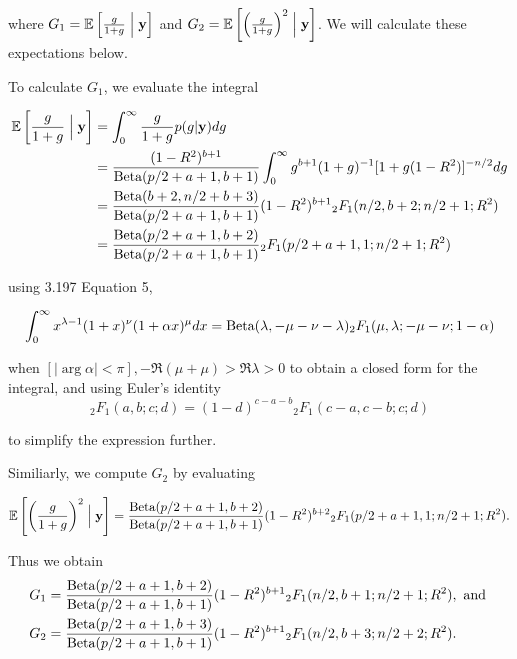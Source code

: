 \documentclass{amsart}[12pt]
\begin{document}
where $G_1 = \mathbb{E}\left[\frac{g}{1 + g} \Bigm| {\bf y} \right]$ and $G_2 = \mathbb{E}\left[ \left(\frac{g}{1 + g} \right)^2 \Bigm| {\bf y} \right]$. We will calculate these expectations below.

To calculate $G_1$, we evaluate the integral

\begin{align*}
	\mathbb{E}\left[\frac{g}{1 + g} \Bigm| {\bf y} \right] & = \int_0^\infty \frac{g}{1 + g} p(g | {\bf y}) dg                                                                      \\
	                                           & = \frac{(1 - R^2)^{b+1}}{\text{Beta}(p/2 + a + 1, b + 1)} \int_0^\infty g^{b+1} (1 + g)^{-1} [1 + g (1 - R^2)]^{-n/2} dg \\
	                                           & = \frac{\text{Beta}(b + 2, n/2 + b + 3)}{\text{Beta}(p /2 + a + 1, b + 1)} (1 - R^2)^{b+1} {}_2 F_1(n/2, b + 2; n/2 + 1; R^2)  \\
	                                           & = \frac{\text{Beta}(p/2 + a + 1, b + 2)}{\text{Beta}(p /2 + a + 1, b + 1)} {}_2 F_1(p/2 + a + 1, 1; n/2 + 1; R^2)              
\end{align*}

using \citep{Gradshteyn1988} 3.197 Equation 5,

\[
	\int_0^\infty x^{\lambda-1} (1+x)^\nu (1 + \alpha x)^{\mu} dx = \text{Beta}(\lambda, -\mu-\nu-\lambda) {}_2 F_1 (\mu, \lambda; -\mu-\nu; 1 - \alpha)
\]

when $[|\arg \alpha| < \pi], -\Re(\mu + \mu) > \Re \lambda > 0$ to obtain a closed form for the integral,  and
using Euler's identity
\[
	{}_2 F_1(a, b; c; d) = (1 - d)^{c - a -  b} {}_2 F_1(c - a, c - b; c; d)
\]

to simplify the expression further.

Similiarly, we compute $G_2$ by evaluating

\[
	\mathbb{E}\left[ \left(\frac{g}{1 + g} \right)^2 \Bigm| {\bf y} \right] = \frac{\text{Beta}(p/2 + a + 1, b + 2)}{\text{Beta}(p /2 + a + 1, b + 1)} (1 - R^2)^{b+2} {}_2 F_1(p/2 + a + 1, 1; n/2 + 1; R^2).
\]

Thus we obtain
\begin{align*}
	G_1 & = \frac{\text{Beta}(p/2 + a + 1, b + 2)}{\text{Beta}(p /2 + a + 1, b + 1)} (1 - R^2)^{b+1} {}_2 F_1(n/2, b + 1; n/2 + 1; R^2), \text{ and } \\
	G_2 & = \frac{\text{Beta}(p/2 + a + 1, b + 3)}{\text{Beta}(p /2 + a + 1, b + 1)} (1 - R^2)^{b+1} {}_2 F_1(n/2, b + 3; n/2 + 2; R^2).              
\end{align*}
\end{document}
